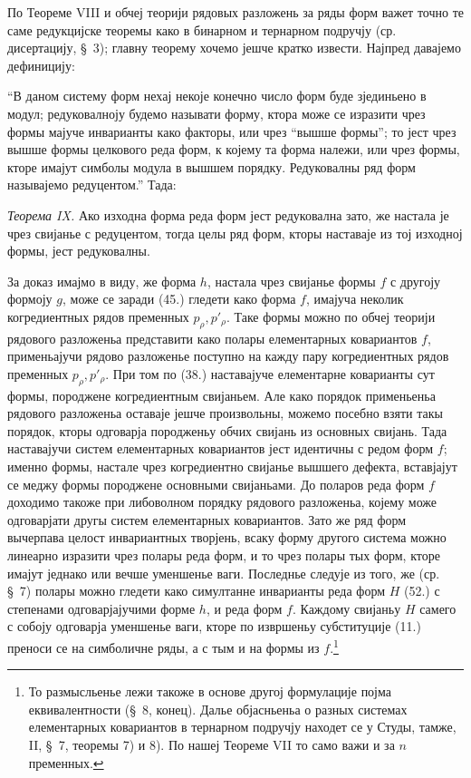 ﻿\documentclass[11pt]{article}
\begin{document}
По Теореме VIII и обчеј теорији рядовых разложень за ряды форм важет точно те саме редукцијске теоремы како в бинарном и тернарном подручју (ср. дисертацију, \S\ 3); главну теорему хочемо јешче кратко извести. Најпред давајемо дефиницију:

``В даном систему форм нехај некоје конечно число форм буде зјединьено в модул; редуковалноју будемо называти форму, ктора може се изразити чрез формы мајуче инварианты како факторы, или чрез ``вышше формы''; то јест чрез вышше формы целкового реда форм, к којему та форма належи, или чрез формы, кторе имајут симболы модула в вышшем порядку. Редуковалны ряд форм называјемо редуцентом.'' Тада:

\emph{Теорема IX.} Ако изходна форма реда форм јест редуковална зато, же настала је чрез свијанье с редуцентом, тогда целы ряд форм, кторы наставаје из тој изходној формы, јест редуковалны.

За доказ имајмо в виду, же форма $h$, настала чрез свијанье формы $f$ с другоју формоју $g$, може се заради (45.) гледети како форма $f$, имајуча неколик когредиентных рядов пременных $p_\rho,p'_\rho$. Таке формы можно по обчеј теорији рядового разложеньа представити како полары елементарных ковариантов $f$, применьајучи рядово разложенье поступно на кажду пару когредиентных рядов пременных $p_\rho,p'_\rho$. При том по (38.) наставајуче елементарне коварианты сут формы, породжене когредиентным свијаньем. Але како порядок применьеньа рядового разложеньа оставаје јешче произвольны, можемо посебно взяти такы порядок, кторы одговарја породженьу обчих свијань из основных свијань. Тада наставајучи систем елементарных ковариантов јест идентичны с редом форм $f$; именно формы, настале чрез когредиентно свијанье вышшего дефекта, вставјајут се меджу формы породжене основными свијаньами. До поларов реда форм $f$ доходимо такоже при либоволном порядку рядового разложеньа, којему може одговарјати другы систем елементарных ковариантов. Зато же ряд форм вычерпава целост инвариантных творјень, всаку форму другого система можно линеарно изразити чрез полары реда форм, и то чрез полары тых форм, кторе имајут једнако или вечше уменшенье ваги. Последнье следује из того, же (ср. \S\ 7) полары можно гледети како симултанне инварианты реда форм $H$ (52.) с степенами одговарјајучими форме $h$, и реда форм $f$. Каждому свијаньу $H$ самего с собоју одговарја уменшенье ваги, кторе по извршеньу субституције (11.) преноси се на симболичне ряды, а с тым и на формы из $f$.\footnote{То размысльенье лежи такоже в основе другој формулације појма еквивалентности (\S\ 8, конец). Далье објасньеньа о разных системах елементарных ковариантов в тернарном подручју находет се у Студы, тамже, II, \S\ 7, теоремы 7) и 8). По нашеј Теореме VII то само важи и за $n$ пременных.}
\end{document}
